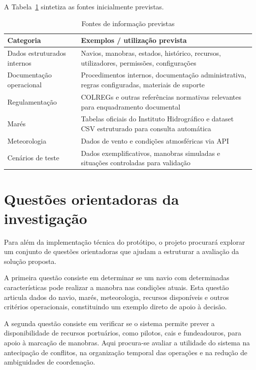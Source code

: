 \documentclass[a4paper,12pt]{report}
\begin{document}
A Tabela~\ref{tab:fontesinfo} sintetiza as fontes inicialmente previstas.

\begin{table}[H]
\centering
\caption{Fontes de informação previstas}
\label{tab:fontesinfo}
\begin{tabular}{>{\raggedright\arraybackslash}p{4cm} >{\raggedright\arraybackslash}p{9cm}}
\toprule
\textbf{Categoria} & \textbf{Exemplos / utilização prevista} \\
\midrule
Dados estruturados internos & Navios, manobras, estados, histórico, recursos, utilizadores, permissões, configurações \\
Documentação operacional & Procedimentos internos, documentação administrativa, regras configuradas, materiais de suporte \\
Regulamentação & COLREGs e outras referências normativas relevantes para enquadramento documental \\
Marés & Tabelas oficiais do Instituto Hidrográfico e dataset CSV estruturado para consulta automática \\
Meteorologia & Dados de vento e condições atmosféricas via API \\
Cenários de teste & Dados exemplificativos, manobras simuladas e situações controladas para validação \\
\bottomrule
\end{tabular}
\end{table}

\section{Questões orientadoras da investigação}

Para além da implementação técnica do protótipo, o projeto procurará explorar um conjunto de questões orientadoras que ajudam a estruturar a avaliação da solução proposta.

A primeira questão consiste em determinar se um navio com determinadas características pode realizar a manobra nas condições atuais. Esta questão articula dados do navio, marés, meteorologia, recursos disponíveis e outros critérios operacionais, constituindo um exemplo direto de apoio à decisão.

A segunda questão consiste em verificar se o sistema permite prever a disponibilidade de recursos portuários, como pilotos, cais e fundeadouros, para apoio à marcação de manobras. Aqui procura-se avaliar a utilidade do sistema na antecipação de conflitos, na organização temporal das operações e na redução de ambiguidades de coordenação.
\end{document}

